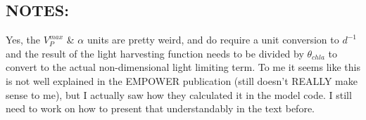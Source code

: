 \documentclass[journal abbreviation, manuscript]{copernicus}
\begin{document}
\subsection{NOTES:}
Yes, the $V^{max}_P$ \& $\alpha$  units are pretty weird, and do require a unit conversion to $d^{-1}$ and the result of the light harvesting function needs to be divided by $\theta_{chla}$ to convert to the actual non-dimensional light limiting term. To me it seems like this is not well explained in the EMPOWER publication (still doesn't REALLY make sense to me), but I actually saw how they calculated it in the model code. I still need to work on how to present that understandably in the text before. 

















\end{document}
